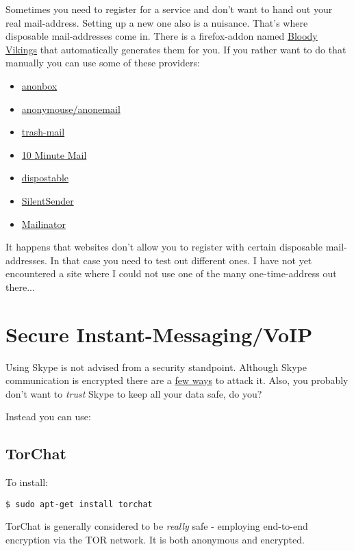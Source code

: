 \documentclass{article}
\begin{document}
 Sometimes you need to register for a service and don't want to hand out your real mail-address. Setting up a new one also is a nuisance. That's where disposable mail-addresses come in. There is a firefox-addon named \href{https://addons.mozilla.org/en-US/firefox/addon/bloody-vikings/}{Bloody Vikings} that automatically generates them for you. If you rather want to do that manually you can use some of these providers:
\begin{itemize}
	\item \href{https://anonbox.net/en/}{ anonbox}
	\item \href{http://anonymouse.org/anonemail.html}{anonymouse/anonemail}
	\item \href{http://trash-mail.com/}{trash-mail}
	\item \href{http://10minutemail.com/10MinuteMail/index.html}{10 Minute Mail}
	\item \href{http://www.dispostable.com/}{dispostable}
	\item \href{https://www.silentsender.com/}{SilentSender}
	\item \href{http://mailinator.com/}{Mailinator}
\end{itemize}


 It happens that websites don't allow you to register with certain disposable mail-addresses. In that case you need to test out different ones. I have not yet encountered a site where I could not use one of the many one-time-address out there...
\section{Secure Instant-Messaging/VoIP}


 Using Skype is not advised from a security standpoint. Although Skype communication is encrypted there are a \href{https://en.wikipedia.org/wiki/Skype_security#Flaws_and_potential_flaws}{few ways} to attack it. Also, you probably don't want to \emph{trust} Skype to keep all your data safe, do you?


 Instead you can use:
\subsection{TorChat}


 To install:
\begin{lstlisting}
$ sudo apt-get install torchat
\end{lstlisting}



 TorChat is generally considered to be \emph{really} safe - employing end-to-end encryption via the TOR network. It is both anonymous and encrypted.
\end{document}
